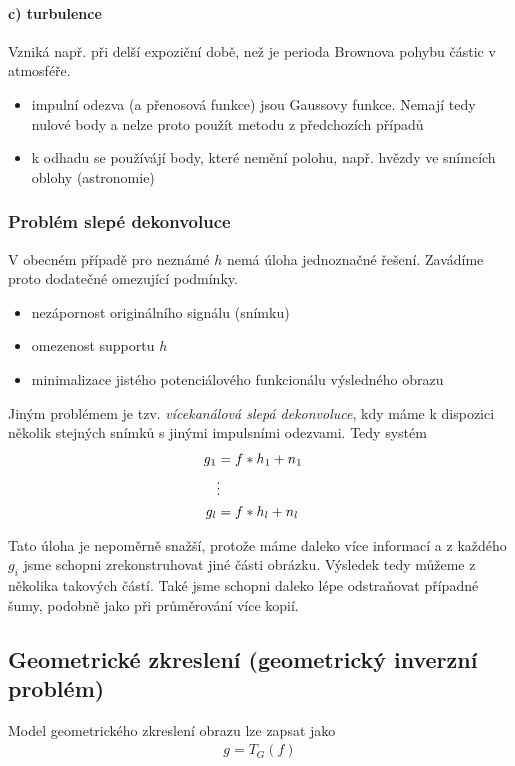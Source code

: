\paragraph{c) turbulence} Vzniká např. při delší expoziční době, než je perioda Brownova pohybu částic v atmosféře. 
\begin{itemize}
\item impulní odezva (a přenosová funkce) jsou Gaussovy funkce. Nemají tedy nulové body a nelze proto použít metodu
z předchozích případů
\item k odhadu se používájí body, které nemění polohu, např. hvězdy ve snímcích oblohy (astronomie)
\end{itemize}

\subsubsection{Problém slepé dekonvoluce}
V obecném případě pro neznámé $h$ nemá úloha jednoznačné řešení. Zavádíme proto dodatečné omezující podmínky.

\begin{itemize}
\item nezápornost originálního signálu (snímku)
\item omezenost supportu $h$
\item minimalizace jistého potenciálového funkcionálu výsledného obrazu
\end{itemize}

Jiným problémem je tzv. \emph{vícekanálová slepá dekonvoluce}, kdy máme k dispozici několik stejných snímků s jinými
impulsními odezvami. Tedy systém
\begin{align}
g_1 &= f\ast h_1+n_1\\
&\vdots&\nonumber\\
g_l &= f\ast h_l+n_l
\end{align}

Tato úloha je nepoměrně snažší, protože máme daleko více informací a z každého $g_i$ jsme schopni zrekonstruhovat 
jiné části obrázku. Výsledek tedy můžeme  z několika takových částí. Také jsme schopni daleko lépe 
odstraňovat případné šumy, podobně jako při průměrování více kopií.

\subsection{Geometrické zkreslení (geometrický inverzní problém)}
Model geometrického zkreslení obrazu lze zapsat jako
\begin{align}
g=T_G(f)
\end{align}

